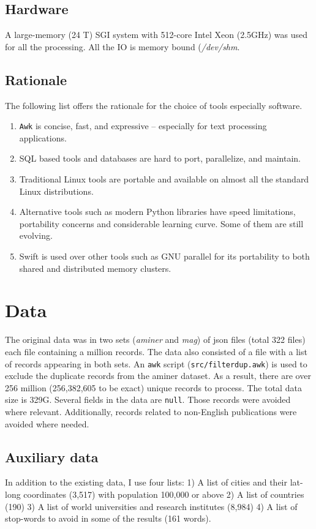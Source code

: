 \documentclass{article}
\begin{document}
\subsection*{Hardware}
A large-memory (24 T) SGI system with 512-core Intel Xeon (2.5GHz) was used for
all the processing. All the IO is memory bound (\textit{/dev/shm}.

\subsection*{Rationale}
The following list offers the rationale for the choice of tools especially software.
\begin{enumerate}
\item \texttt{Awk} is concise, fast, and expressive -- especially for text processing applications.
\item SQL based tools and databases are hard to port, parallelize, and maintain.
\item Traditional Linux tools are portable and available on almost all the standard Linux distributions.
\item Alternative tools such as modern Python libraries have speed limitations, portability concerns and considerable learning curve. Some of them are still evolving.
\item Swift is used over other tools such as GNU parallel for its portability to both shared and distributed memory clusters.
\end{enumerate}

\section*{Data}
The original data was in two sets (\textit{aminer} and \textit{mag}) of json
files (total 322 files) each file containing a million records. The data also
consisted of a file with a list of records appearing in both sets. An \texttt{awk} script
(\texttt{src/filterdup.awk}) is used to exclude the duplicate records from the
aminer dataset. As a result, there are over 256 million (256,382,605 to be
exact) unique records to process. The total data size is 329G. Several
fields in the data are \texttt{null}.  Those records were avoided where
relevant. Additionally, records related to non-English publications were
avoided where needed.


\subsection*{Auxiliary data}
In addition to the existing data, I use four lists: 1) A list of cities and their
lat-long coordinates (3,517) with population 100,000 or above 2) A list
of countries (190) 3) A list of world universities and research institutes
(8,984) 4) A list of stop-words to avoid in some of the results (161 words).
\end{document}
